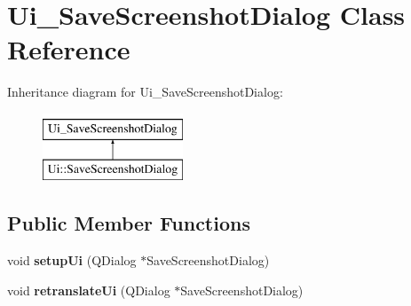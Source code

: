 \hypertarget{class_ui___save_screenshot_dialog}{}\section{Ui\+\_\+\+Save\+Screenshot\+Dialog Class Reference}
\label{class_ui___save_screenshot_dialog}
Inheritance diagram for Ui\+\_\+\+Save\+Screenshot\+Dialog\+:\begin{figure}[H]
\begin{center}
\leavevmode
\includegraphics[height=2.000000cm]{class_ui___save_screenshot_dialog}
\end{center}
\end{figure}
\subsection*{Public Member Functions}
\begin{DoxyCompactItemize}
\item 
\hypertarget{class_ui___save_screenshot_dialog_a47d8228a1dd7c5bd29e92db7886859e4}{}void {\bfseries setup\+Ui} (Q\+Dialog $\ast$Save\+Screenshot\+Dialog)\label{class_ui___save_screenshot_dialog_a47d8228a1dd7c5bd29e92db7886859e4}

\item 
\hypertarget{class_ui___save_screenshot_dialog_a21818d304b993f863b5162e3c1d85c38}{}void {\bfseries retranslate\+Ui} (Q\+Dialog $\ast$Save\+Screenshot\+Dialog)\label{class_ui___save_screenshot_dialog_a21818d304b993f863b5162e3c1d85c38}

\end{DoxyCompactItemize}
